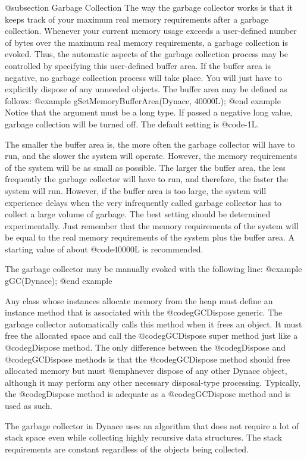 @subsection Garbage Collection
The way the garbage collector works is that it keeps track of your
maximum real memory requirements after a garbage collection.  Whenever
your current memory usage exceeds a user-defined number of bytes over
the maximum real memory requirements, a garbage collection is evoked.
Thus, the automatic aspects of the garbage collection process may be
controlled by specifying this user-defined buffer area.  If the buffer
area is negative, no garbage collection process will take place.  You
will just have to explicitly dispose of any unneeded objects.  The
buffer area may be defined as follows:
@example
        gSetMemoryBufferArea(Dynace, 40000L);
@end example
Notice that the argument must be a long type.  If passed a negative long value,
garbage collection will be turned off.  The default setting is @code{-1L}.

The smaller the buffer area is, the more often the garbage collector will
have to run, and the slower the system will operate.  However, the memory
requirements of the system will be as small as possible.  The larger the
buffer area, the less frequently the garbage collector will have to run, and
therefore, the faster the system will run.  However, if the buffer area is
too large, the system will experience delays when the very infrequently
called garbage collector has to collect a large volume of garbage.  The
best setting should be determined experimentally.  Just remember that
the memory requirements of the system will be equal to the real memory
requirements of the system plus the buffer area.  A starting value
of about @code{40000L} is recommended.

The garbage collector may be manually evoked with the following line:
@example
        gGC(Dynace);
@end example

Any class whose instances allocate memory from the heap must define an
instance method that is associated with the @code{gGCDispose} generic.
The garbage collector automatically calls this method when it frees an
object.  It must free the allocated space and call the @code{gGCDispose}
super method just like a @code{gDispose} method.  The only difference
between the @code{gDispose} and @code{gGCDispose} methods is that the
@code{gGCDispose} method should free allocated memory but must
@emph{never} dispose of any other Dynace object, although it may perform
any other necessary disposal-type processing.  Typically, the
@code{gDispose} method is adequate as a @code{gGCDispose} method and is
used as such.

The garbage collector in Dynace uses an algorithm that does not require a
lot of stack space even while collecting highly recursive data
structures.  The stack requirements are constant regardless of the
objects being collected.

